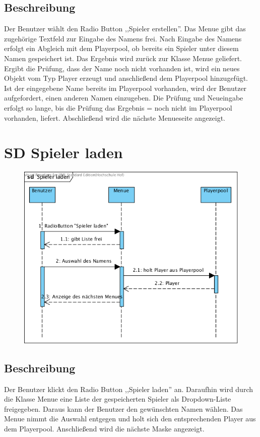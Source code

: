 \subsection{Beschreibung}
Der Benutzer wählt den Radio Button ,,Spieler erstellen''. Das Menue gibt das zugehörige Textfeld zur Eingabe des Namens frei. Nach Eingabe des Namens erfolgt ein Abgleich mit dem Playerpool, ob bereits ein Spieler unter diesem Namen gespeichert ist. Das Ergebnis wird zurück zur Klasse Menue geliefert. Ergibt die Prüfung, dass der Name noch nicht vorhanden ist, wird ein neues Objekt vom Typ Player erzeugt und anschließend dem Playerpool hinzugefügt. Ist der eingegebene Name bereits im Playerpool vorhanden, wird der Benutzer aufgefordert, einen anderen Namen einzugeben. Die Prüfung und Neueingabe erfolgt so lange, bis die Prüfung das Ergebnis = noch nicht im Playerpool vorhanden, liefert. Abschließend wird die nächste Menueseite angezeigt.

\clearpage
\section{SD Spieler laden}
\begin{figure}[h!]
	\centering
    \includegraphics[width=\textwidth]{./SD_Spieler_laden.png}
	\label{layout_gesamt}
\end{figure}
\subsection{Beschreibung}
Der Benutzer klickt den Radio Button ,,Spieler laden'' an. Daraufhin wird durch die Klasse Menue eine Liste der gespeicherten Spieler als Dropdown-Liste freigegeben. Daraus kann der Benutzer den gewünschten Namen wählen. Das Menue nimmt die Auswahl entgegen und holt sich den entsprechenden Player aus dem Playerpool. Anschließend wird die nächste Maske angezeigt.

